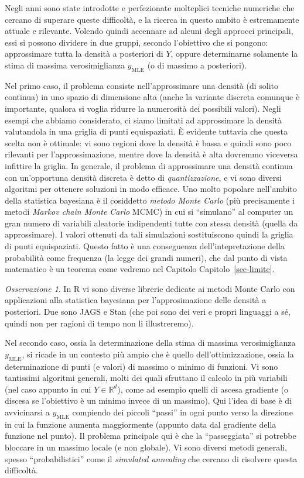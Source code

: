 \documentclass[
  italian,
  letterpaper,
]{book}
\newcommand{\R}{\mathbb{R}}
\newcommand{\mle}{\operatorname{MLE}}
\theoremstyle{definition}
\theoremstyle{remark}
\newtheorem*{remark}{Osservazione}
\begin{document}
Negli anni sono state introdotte e perfezionate molteplici tecniche
numeriche che cercano di superare queste difficoltà, e la ricerca in
questo ambito è estremamente attuale e rilevante. Volendo quindi
accennare ad alcuni degli approcci principali, essi si possono dividere
in due gruppi, secondo l'obiettivo che si pongono: approssimare tutta la
densità a posteriori di \(Y\), oppure determinarne solamente la stima di
massima verosimiglianza \(y_{\mle}\) (o di massimo a posteriori).

Nel primo caso, il problema consiste nell'approssimare una densità (di
solito continua) in uno spazio di dimensione alta (anche la variante
discreta comunque è importante, qualora si voglia ridurre la numerosità
dei possibili valori). Negli esempi che abbiamo considerato, ci siamo
limitati ad approssimare la densità valutandola in una griglia di punti
equispaziati. È evidente tuttavia che questa scelta non è ottimale: vi
sono regioni dove la densità è bassa e quindi sono poco rilevanti per
l'approssimazione, mentre dove la densità è alta dovremmo viceversa
infittire la griglia. In generale, il problema di approssimare una
densità continua con un'opportuna densità discreta è detto di
\emph{quantizzazione}, e vi sono diversi algoritmi per ottenere
soluzioni in modo efficace. Uno molto popolare nell'ambito della
statistica bayesiana è il cosiddetto \emph{metodo Monte Carlo} (più
precisamente i metodi \emph{Markov chain Monte Carlo} MCMC) in cui si
``simulano'' al computer un gran numero di variabili aleatorie
indipendenti tutte con stessa densità (quella da approssimare). I valori
ottenuti da tali simulazioni sostituiscono quindi la griglia di punti
equispaziati. Questo fatto è una conseguenza dell'intepretazione della
probabilità come frequenza (la legge dei grandi numeri), che dal punto
di vista matematico è un teorema come vedremo nel Capitolo
Capitolo~\ref{sec-limite}.

\begin{remark}
In R vi sono diverse librerie dedicate ai metodi Monte Carlo con
applicazioni alla statistica bayesiana per l'approsimazione delle
densità a posteriori. Due sono JAGS e Stan (che poi sono dei veri e
propri linguaggi a sé, quindi non per ragioni di tempo non li
illustreremo).
\end{remark}

Nel secondo caso, ossia la determinazione della stima di massima
verosimiglianza \(y_{\mle}\), si ricade in un contesto più ampio che è
quello dell'ottimizzazione, ossia la determinazione di punti (e valori)
di massimo o minimo di funzioni. Vi sono tantissimi algoritmi generali,
molti dei quali sfruttano il calcolo in più variabili (nel caso appunto
in cui \(Y \in \R^d\)), come ad esempio quelli di ascesa gradiente (o
discesa se l'obiettivo è un minimo invece di un massimo). Qui l'idea di
base è di avvicinarsi a \(y_{\mle}\) compiendo dei piccoli ``passi'' in
ogni punto verso la direzione in cui la funzione aumenta maggiormente
(appunto data dal gradiente della funzione nel punto). Il problema
principale qui è che la ``passeggiata'' si potrebbe bloccare in un
massimo locale (e non globale). Vi sono diversi metodi generali, spesso
``probabilistici'' come il \emph{simulated annealing} che cercano di
risolvere questa difficoltà.
\end{document}
